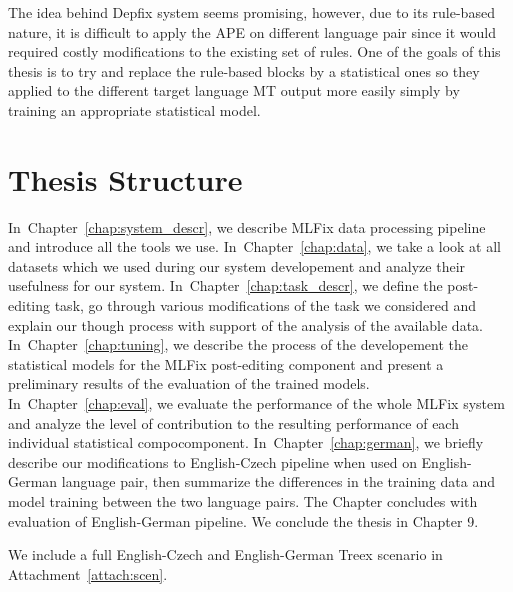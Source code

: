 The idea behind Depfix system seems promising, however, due to its rule-based nature, it is difficult
to apply the APE on different language pair since it would required costly modifications to the
existing set of rules. One of the goals of this thesis is to try and replace the rule-based blocks
by a statistical ones so they applied to the different target language MT output more easily simply
by training an appropriate statistical model.


\section{Thesis Structure}

In~Chapter~\ref{chap:system_descr}, we describe MLFix data processing
pipeline and introduce all the tools we use.
In~Chapter~\ref{chap:data}, we take a look at all datasets which we used during our system
developement and analyze their usefulness for our system.
In~Chapter~\ref{chap:task_descr}, we define the post-editing task, go through
various modifications of the task we considered and explain our though
process with support of the analysis of the available data.
In~Chapter~\ref{chap:tuning}, we describe the process of the developement
the statistical models for the MLFix post-editing component and present
a preliminary results of the evaluation of the trained models.
In~Chapter~\ref{chap:eval}, we evaluate the performance of the whole MLFix system
and analyze the level of contribution to the resulting performance
of each individual statistical compocomponent.
In~Chapter~\ref{chap:german}, we briefly describe our modifications to English-Czech pipeline
when used on English-German language pair, then summarize the differences
in the training data and model training between the two language pairs. The Chapter concludes with evaluation of English-German pipeline.
We conclude the thesis in Chapter 9.

We include a full English-Czech and English-German Treex scenario in Attachment~\ref{attach:scen}.



